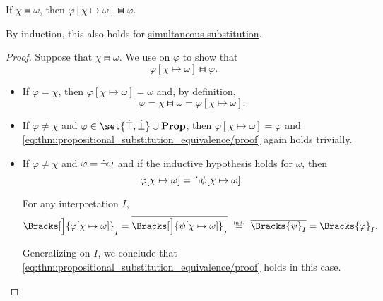 \begin{proposition}\label{thm:propositional_substitution_equivalence}
  If \( \chi \gleichstark \omega \), then \( \varphi[\chi \mapsto \omega] \gleichstark \varphi \).
\end{proposition}
\begin{comments}
  \item By induction, this also holds for \hyperref[def:propositional_substitution/simultaneous]{simultaneous substitution}.
\end{comments}
\begin{proof}
  Suppose that \( \chi \gleichstark \omega \). We use  on \( \varphi \) to show that
  \begin{equation}\label{eq:thm:propositional_substitution_equivalence/proof}
    \varphi[\chi \mapsto \omega] \gleichstark \varphi.
  \end{equation}

  \begin{itemize}
    \item If \( \varphi = \chi \), then \( \varphi[\chi \mapsto \omega] = \omega \) and, by definition,
    \begin{equation*}
      \varphi = \chi \gleichstark \omega = \varphi[\chi \mapsto \omega].
    \end{equation*}

    \item If \( \varphi \neq \chi \) and \( \varphi \in \set{ \syntop, \synbot } \cup \boldop{Prop} \), then \( \varphi[\chi \mapsto \omega] = \varphi \) and \eqref{eq:thm:propositional_substitution_equivalence/proof} again holds trivially.

    \item If \( \varphi \neq \chi \) and \( \varphi = \dot\neg \omega \) and if the inductive hypothesis holds for \( \omega \), then
    \begin{equation*}
      \varphi[\chi \mapsto \omega] = \dot\neg \psi[\chi \mapsto \omega].
    \end{equation*}

    For any interpretation \( I \),
    \begin{equation*}
      \Bracks[\Big]{ \varphi[\chi \mapsto \omega] }_I
      =
      \oline{\Bracks[\Big]{\psi[\chi \mapsto \omega] }_I}
      \reloset {\T{ind.}} =
      \oline{\Bracks{\psi}_I}
      =
      \Bracks{\varphi}_I.
    \end{equation*}

    Generalizing on \( I \), we conclude that \eqref{eq:thm:propositional_substitution_equivalence/proof} holds in this case.


\end{itemize}
\end{proof}
